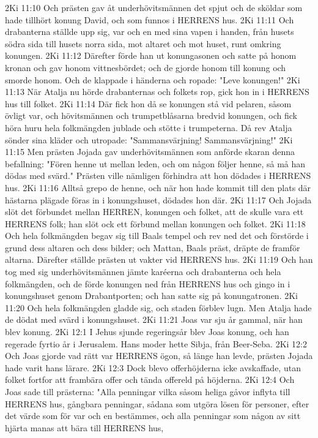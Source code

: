 2Ki 11:10  Och prästen gav åt underhövitsmännen det spjut och de sköldar som hade tillhört konung David, och som funnos i HERRENS hus.
2Ki 11:11  Och drabanterna ställde upp sig, var och en med sina vapen i handen, från husets södra sida till husets norra sida, mot altaret och mot huset, runt omkring konungen.
2Ki 11:12  Därefter förde han ut konungasonen och satte på honom kronan och gav honom vittnesbördet; och de gjorde honom till konung och smorde honom. Och de klappade i händerna och ropade: "Leve konungen!"
2Ki 11:13  När Atalja nu hörde drabanternas och folkets rop, gick hon in i HERRENS hus till folket.
2Ki 11:14  Där fick hon då se konungen stå vid pelaren, såsom övligt var, och hövitsmännen och trumpetblåsarna bredvid konungen, och fick höra huru hela folkmängden jublade och stötte i trumpeterna. Då rev Atalja sönder sina kläder och utropade: "Sammansvärjning! Sammansvärjning!"
2Ki 11:15  Men prästen Jojada gav underhövitsmännen som anförde skaran denna befallning: "Fören henne ut mellan leden, och om någon följer henne, så må han dödas med svärd." Prästen ville nämligen förhindra att hon dödades i HERRENS hus.
2Ki 11:16  Alltså grepo de henne, och när hon hade kommit till den plats där hästarna plägade föras in i konungshuset, dödades hon där.
2Ki 11:17  Och Jojada slöt det förbundet mellan HERREN, konungen och folket, att de skulle vara ett HERRENS folk; han slöt ock ett förbund mellan konungen och folket.
2Ki 11:18  Och hela folkmängden begav sig till Baals tempel och rev ned det och förstörde i grund dess altaren och dess bilder; och Mattan, Baals präst, dräpte de framför altarna. Därefter ställde prästen ut vakter vid HERRENS hus.
2Ki 11:19  Och han tog med sig underhövitsmännen jämte karéerna och drabanterna och hela folkmängden, och de förde konungen ned från HERRENS hus och gingo in i konungshuset genom Drabantporten; och han satte sig på konungatronen.
2Ki 11:20  Och hela folkmängden gladde sig, och staden förblev lugn. Men Atalja hade de dödat med svärd i konungshuset.
2Ki 11:21  Joas var sju år gammal, när han blev konung.
2Ki 12:1  I Jehus sjunde regeringsår blev Joas konung, och han regerade fyrtio år i Jerusalem. Hans moder hette Sibja, från Beer-Seba.
2Ki 12:2  Och Joas gjorde vad rätt var HERRENS ögon, så länge han levde, prästen Jojada hade varit hans lärare.
2Ki 12:3  Dock blevo offerhöjderna icke avskaffade, utan folket fortfor att frambära offer och tända offereld på höjderna.
2Ki 12:4  Och Joas sade till prästerna: "Alla penningar vilka såsom heliga gåvor inflyta till HERRENS hus, gångbara penningar, sådana som utgöra lösen för personer, efter det värde som för var och en bestämmes, och alla penningar som någon av sitt hjärta manas att bära till HERRENS hus,
